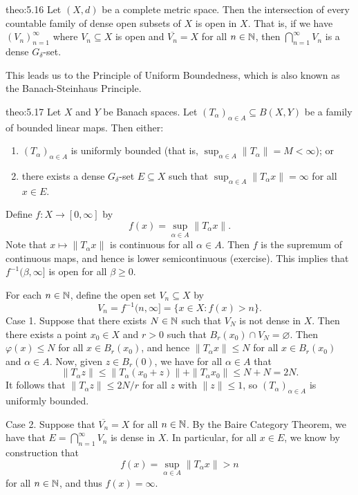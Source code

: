 \begin{theo}{theo:5.16}
    Let $(X, d)$ be a complete metric space. Then the intersection of 
    every countable family of dense open subsets of $X$ is open in $X$. 
    That is, if we have $(V_n)_{n=1}^\infty$ where $V_n \subseteq X$ is 
    open and $\overline{V_n} = X$ for all $n \in \mathbb{N}$, then 
    $\bigcap_{n=1}^\infty V_n$ is a dense $G_\delta$-set. 
\end{theo}

This leads us to the Principle of Uniform Boundedness, which is 
also known as the Banach-Steinhaus Principle. 

\begin{theo}{theo:5.17}
    Let $X$ and $Y$ be Banach spaces. Let $(T_\alpha)_{\alpha\in A} 
    \subseteq B(X, Y)$ be a family of bounded linear maps. Then either: 
    \begin{enumerate}[(1)]
        \item $(T_\alpha)_{\alpha \in A}$ is uniformly bounded (that is, 
        $\sup_{\alpha \in A} \|T_\alpha\| = M < \infty$); or 
        \item there exists a dense $G_\delta$-set $E \subseteq X$ such that 
        $\sup_{\alpha \in A} \|T_\alpha x\| = \infty$ for all $x \in E$. 
    \end{enumerate}
\end{theo}
\begin{pf}
    Define $f : X \to [0, \infty]$ by 
    \[ f(x) = \sup_{\alpha\in A} \|T_\alpha x\|. \] 
    Note that $x \mapsto \|T_\alpha x\|$ is continuous for all $\alpha \in A$. 
    Then $f$ is the supremum of continuous maps, and hence is 
    lower semicontinuous (exercise). This implies that $f^{-1}(\beta, \infty]$ 
    is open for all $\beta \geq 0$. 

    For each $n \in \mathbb{N}$, define the open set $V_n \subseteq X$ by 
    \[ V_n = f^{-1}(n, \infty] = \{x \in X : f(x) > n\}. \] 
    {\sc Case 1.} Suppose that there exists $N \in \mathbb{N}$ such that 
    $V_N$ is not dense in $X$. 
    Then there exists a point $x_0 \in X$ and $r > 0$ such that $B_r(x_0) 
    \cap V_N = \varnothing$. Then $\varphi(x) \leq N$ for all $x \in 
    B_r(x_0)$, and hence $\|T_\alpha x\| \leq N$ for all $x \in B_r(x_0)$
    and $\alpha \in A$. Now, given $z \in B_r(0)$, we have 
    for all $\alpha \in A$ that 
    \[ \|T_\alpha z\| \leq \|T_\alpha (x_0 + z)\| + \|T_\alpha x_0\| 
    \leq N + N = 2N. \] 
    It follows that $\|T_\alpha z\| \leq 2N/r$ for all $z$ with 
    $\|z\| \leq 1$, so $(T_\alpha)_{\alpha \in A}$ is uniformly bounded. 

    {\sc Case 2.} Suppose that $\overline{V_n} = X$ for all $n \in \mathbb{N}$. 
    By the Baire Category Theorem, we have that $E = \bigcap_{n=1}^\infty V_n$ 
    is dense in $X$. In particular, for all $x \in E$, we know by 
    construction that 
    \[ f(x) = \sup_{\alpha \in A} \|T_\alpha x\| > n \] 
    for all $n \in \mathbb{N}$, and thus $f(x) = \infty$. 
\end{pf}

